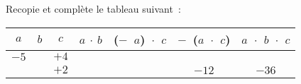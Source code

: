 \begin{exercice}
Recopie et complète le tableau suivant :
{\small
\begin{center}
\begin{tabular}{|c|c|c|c|c|c|c|}
\hline
\cellcolor{H2} $a$ & \cellcolor{H2} $b$ & \cellcolor{H2} $c$ & \cellcolor{A2} $a$ $\cdot$ $b$ &  \cellcolor{A2} ($-$ $a$) $\cdot$ $c$ &  \cellcolor{A2} $-$ ($a$ $\cdot$ $c$) &  \cellcolor{A2} $a$ $\cdot$ $b$ $\cdot$ $c$ \\\hline 
\cellcolor{H3} $-5$ & \cellcolor{H3} & \cellcolor{H3} $+4$ & \cellcolor{A3} & \cellcolor{A3} & \cellcolor{A3} & \cellcolor{A3} \\\hline
\cellcolor{H3} & \cellcolor{H3} & \cellcolor{H3} $+2$ & \cellcolor{A3} & \cellcolor{A3} & \cellcolor{A3} $-12$ & \cellcolor{A3} $-36$ \\\hline
 \end{tabular}
 \end{center}
 } %
\end{exercice}
